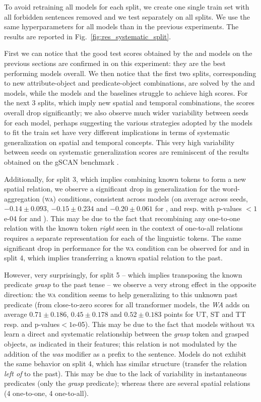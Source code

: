 To avoid retraining all models for each split, we create one single train set with all forbidden sentences removed and we test separately on all splits. We use the same hyperparameters for all models than in the previous experiments. The results are reported in Fig.~\ref{fig:res_systematic_split}.

First we can notice that the good test scores obtained by the \utm and \ttm models on the previous sections are confirmed in on this experiment: they are the best performing models overall. We then notice that the first two splits, corresponding to new attribute-object and predicate-object combinations, are solved by the \utm and \ttm models, while the \stm models and the \lstm baselines struggle to achieve high scores. For the next 3 splits, which imply new spatial and temporal combinations, the scores overall drop significantly; we also observe much wider variability between seeds for each model, perhaps suggesting the various strategies adopted by the models to fit the train set have very different implications in terms of systematic generalization on spatial and temporal concepts. This very high variability between seeds on systematic generalization scores are reminiscent of the results obtained on the gSCAN benchmark \cite{ruis2020benchmark}.

Additionally, for split 3, which implies combining known tokens to form a new spatial relation, we observe a significant drop in generalization for the word-aggregation (\textsc{wa}) conditions, consistent across models (on average across seeds, $-0.14 \pm 0.093$, $-0.15 \pm 0.234$ and $-0.20 \pm 0.061$  for \utm, \stm and \ttm resp. with p-values $<1$e-04 for \utm and \stm). This may be due to the fact that recombining any one-to-one relation with the known token \textit{right} seen in the context of one-to-all relations requires a separate representation for each of the linguistic tokens. The same significant drop in performance for the \textsc{wa} condition can be observed for \utm and \ttm in split 4, which implies transferring a known spatial relation to the past.

However, very surprisingly, for split 5 -- which implies transposing the known predicate \textit{grasp} to the past tense -- we observe a very strong effect in the opposite direction: the \textsc{wa} condition seems to help generalizing to this unknown past predicate (from close-to-zero scores for all transformer models, the \textit{WA} adds on average $0.71 \pm 0.186$, $0.45 \pm 0.178$ and $0.52 \pm 0.183$ points for UT, ST and TT resp. and p-values$<1$e-05). This may be due to the fact that models without \textsc{wa} learn a direct and systematic relationship between the \textit{grasp} token and grasped objects, as indicated in their features; this relation is not modulated by the addition of the \textit{was} modifier as a prefix to the sentence. Models do not exhibit the same behavior on split 4, which has similar structure (transfer the relation \textit{left of} to the past). This may be due to the lack of variability in instantaneous predicates (only the \textit{grasp} predicate); whereas there are several spatial relations (4 one-to-one, 4 one-to-all).

